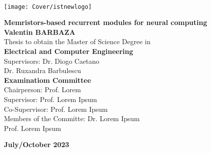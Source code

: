 \newcommand\blurredimage[3]{
  \node[opacity=0.2] at (#1) {\texttt{[image: \#3]}};
  \node[opacity=0.2] at (#1+ #2, #2) {\texttt{[image: \#3]}};
  \node[opacity=0.2] at (#1+-#2, #2) {\texttt{[image: \#3]}};
  \node[opacity=0.2] at (#1+-#2,-#2) {\texttt{[image: \#3]}};
  \node[opacity=0.2] at (#1+ #2,-#2) {\texttt{[image: \#3]}};
}
\setcounter{page}{1} 


\thispagestyle{empty}

\begin{flushleft}
  ~\\ \vspace{-12mm} \hspace{-12mm}
  \texttt{[image: Cover/istnewlogo]}
  \vspace{10mm}
  \\ \begin{center}
  \end{center} %

  \vspace{5mm}
  \centering
  \LARGE \textbf{Memristors-based recurrent modules for neural computing}
  \\ \vspace{15mm}
  \Large \textbf{Valentin BARBAZA} \\
  \vspace{12mm}
  \large Thesis to obtain the Master of Science Degree in
  \\ \vspace{2mm}
  \LARGE \textbf{Electrical and Computer Engineering}
  \\ \vspace{10mm}
  \large Supervisors: Dr. Diogo Caetano \\
  \large Dr. Ruxandra Barbulescu
  \\ \vspace{15mm}
  \Large \textbf{Examinatiom Committee}
  \\ \vspace{5mm}
  \large Chairperson: Prof. Lorem \\
  \large Supervisor: Prof. Lorem Ipsum\\
  \large Co-Supervisor: Prof. Lorem Ipsum \\
  \large Members of the Committe: Dr. Lorem Ipsum \\
  Prof. Lorem Ipsum

  \vspace{10mm}

  \Large \textbf{July/October 2023} \\
  \let\thepage\relax
\end{flushleft}
\pagebreak


